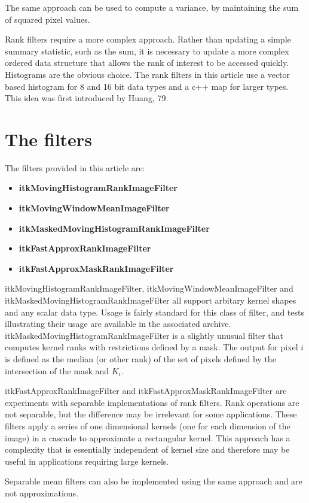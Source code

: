 \documentclass{InsightArticle}
\begin{document}
The same approach can be used to compute a variance, by maintaining
the sum of squared pixel values.

Rank filters require a more complex approach. Rather than updating a
simple summary statistic, such as the sum, it is necessary to update a
more complex ordered data structure that allows the rank of interest
to be accessed quickly. Histograms are the obvious choice. The rank
filters in this article use a vector based histogram for 8 and 16 bit
data types and a c++ map for larger types. This idea was first
introduced by Huang, 79.

\section{The filters}
The filters provided in this article are:
\begin{itemize}
\item {\bf itkMovingHistogramRankImageFilter}
\item {\bf itkMovingWindowMeanImageFilter}
\item {\bf itkMaskedMovingHistogramRankImageFilter}
\item {\bf itkFastApproxRankImageFilter}
\item {\bf itkFastApproxMaskRankImageFilter}
\end{itemize}

itkMovingHistogramRankImageFilter, itkMovingWindowMeanImageFilter and
itkMaskedMovingHistogramRankImageFilter all support arbitary kernel
shapes and any scalar data type. Usage is fairly standard for this
class of filter, and tests illustrating their usage are available in
the associated archive. itkMaskedMovingHistogramRankImageFilter is a
slightly unusual filter that computes kernel ranks with restrictions
defined by a mask. The output for pixel $i$ is defined as the median
(or other rank) of the set of pixels defined by the intersection of
the mask and $K_i$.

itkFastApproxRankImageFilter and itkFastApproxMaskRankImageFilter are
experiments with separable implementations of rank filters. Rank
operations are not separable, but the difference may be irrelevant for
some applications. These filters apply a series of one dimensional
kernels (one for each dimension of the image) in a cascade to
approximate a rectangular kernel. This approach has a complexity that
is essentially independent of kernel size and therefore may be useful
in applications requiring large kernels.

Separable mean filters can also be implemented using the same approach
and are not approximations.
\end{document}
